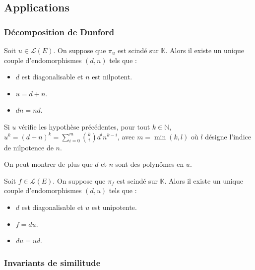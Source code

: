 	\subsection{Applications}
	
	\subsubsection{Décomposition de Dunford}
	
	
	\begin{theorem}
		Soit $u \in \mathcal{L}(E)$. On suppose que $\pi_u$ est scindé sur $\mathbb{K}$. Alors il existe un unique couple d'endomorphismes $(d, n)$ tels que :
		\begin{itemize}
			\item $d$ est diagonalisable et $n$ est nilpotent.
			\item $u = d + n$.
			\item $d n = n d$.
		\end{itemize}
	\end{theorem}
	
	\begin{corollary}
		Si $u$ vérifie les hypothèse précédentes, pour tout $k \in \mathbb{N}$, $u^k = (d + n)^k = \sum_{i=0}^m \binom{k}{i} d^i n^{k-i}$, avec $m = \min(k, l)$ où $l$ désigne l'indice de nilpotence de $n$.
	\end{corollary}
	
	\begin{remark}
		On peut montrer de plus que $d$ et $n$ sont des polynômes en $u$.
	\end{remark}
	
	
	\begin{theorem}
		Soit $f \in \mathcal{L}(E)$. On suppose que $\pi_f$ est scindé sur $\mathbb{K}$. Alors il existe un unique couple d'endomorphismes $(d, u)$ tels que :
		\begin{itemize}
			\item $d$ est diagonalisable et $u$ est unipotente.
			\item $f = du$.
			\item $du = ud$.
		\end{itemize}
	\end{theorem}
	
	\subsubsection{Invariants de similitude}
	
